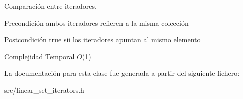 Comparación entre iteradores. 

\begin{DoxyPrecond}{Precondición}
ambos iteradores refieren a la misma colección 
\end{DoxyPrecond}
\begin{DoxyPostcond}{Postcondición}
true sii los iteradores apuntan al mismo elemento
\end{DoxyPostcond}

\begin{DoxyDescription}
\item[Complejidad Temporal]$O$(1)
\end{DoxyDescription}

La documentación para esta clase fue generada a partir del siguiente fichero\-:\begin{DoxyCompactItemize}
\item 
src/linear\-\_\-set\-\_\-iterators.\-h\end{DoxyCompactItemize}
